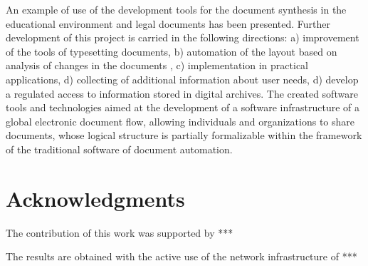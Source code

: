 \documentclass[conference,a4paper]{IEEEtran}
\providecommand\url[1]{\texttt{#1}}
\begin{document}
An example of use of the development tools for the document synthesis in
the educational environment and legal documents has been presented.
Further development of this project is carried in the following
directions: a) improvement of the tools of typesetting documents, b)
automation of the layout based on analysis of changes in the documents
\cite{b2}, c) implementation in practical applications, d) collecting of
additional information about user needs, d) develop a regulated access
to information stored in digital archives. The created software tools
and technologies aimed at the development of a software infrastructure
of a global electronic document flow, allowing individuals and
organizations to share documents, whose logical structure is partially
formalizable within the framework of the traditional software of
document automation.

\section{Acknowledgments}
The contribution of this work was supported by ***

The results are obtained with the active use of the network
infrastructure of ***
\end{document}

